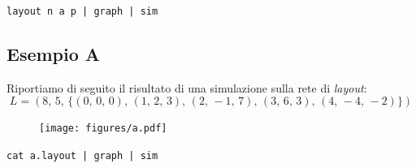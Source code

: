 \documentclass[a4paper,12pt]{article}
\theoremstyle{definition}
\begin{document}
\centerline{\texttt{layout n a p | graph | sim}}

\subsection{Esempio A}

Riportiamo di seguito il risultato di una simulazione sulla rete di \emph{layout}:
\begin{equation*}
L = (8,\,5,\,\{(0,\,0,\,0),\,(1,\,2,\,3),\,(2,\,-1,\,7),\,(3,\,6,\,3),\,(4,\,-4,\,-2)\})
\end{equation*}

\begin{figure}[H]
\centering
\texttt{[image: figures/a.pdf]}
\caption{}
\end{figure}

\texttt{cat a.layout | graph | sim}
\end{document}

